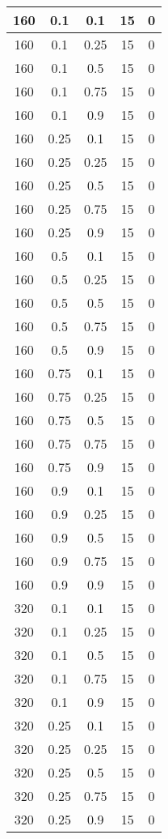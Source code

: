\documentclass{bmstu}
\begin{document}
\begin{center}
\begin{longtable}[c]{|c|c|c|c|c|}
160 & 0.1 & 0.1 & 15 & 0 \\\hline
160 & 0.1 & 0.25 & 15 & 0 \\\hline
160 & 0.1 & 0.5 & 15 & 0 \\\hline
160 & 0.1 & 0.75 & 15 & 0 \\\hline
160 & 0.1 & 0.9 & 15 & 0 \\\hline
160 & 0.25 & 0.1 & 15 & 0 \\\hline
160 & 0.25 & 0.25 & 15 & 0 \\\hline
160 & 0.25 & 0.5 & 15 & 0 \\\hline
160 & 0.25 & 0.75 & 15 & 0 \\\hline
160 & 0.25 & 0.9 & 15 & 0 \\\hline
160 & 0.5 & 0.1 & 15 & 0 \\\hline
160 & 0.5 & 0.25 & 15 & 0 \\\hline
160 & 0.5 & 0.5 & 15 & 0 \\\hline
160 & 0.5 & 0.75 & 15 & 0 \\\hline
160 & 0.5 & 0.9 & 15 & 0 \\\hline
160 & 0.75 & 0.1 & 15 & 0 \\\hline
160 & 0.75 & 0.25 & 15 & 0 \\\hline
160 & 0.75 & 0.5 & 15 & 0 \\\hline
160 & 0.75 & 0.75 & 15 & 0 \\\hline
160 & 0.75 & 0.9 & 15 & 0 \\\hline
160 & 0.9 & 0.1 & 15 & 0 \\\hline
160 & 0.9 & 0.25 & 15 & 0 \\\hline
160 & 0.9 & 0.5 & 15 & 0 \\\hline
160 & 0.9 & 0.75 & 15 & 0 \\\hline
160 & 0.9 & 0.9 & 15 & 0 \\\hline
320 & 0.1 & 0.1 & 15 & 0 \\\hline
320 & 0.1 & 0.25 & 15 & 0 \\\hline
320 & 0.1 & 0.5 & 15 & 0 \\\hline
320 & 0.1 & 0.75 & 15 & 0 \\\hline
320 & 0.1 & 0.9 & 15 & 0 \\\hline
320 & 0.25 & 0.1 & 15 & 0 \\\hline
320 & 0.25 & 0.25 & 15 & 0 \\\hline
320 & 0.25 & 0.5 & 15 & 0 \\\hline
320 & 0.25 & 0.75 & 15 & 0 \\\hline
320 & 0.25 & 0.9 & 15 & 0 \\\hline

\end{longtable}
\end{center}
\end{document}
